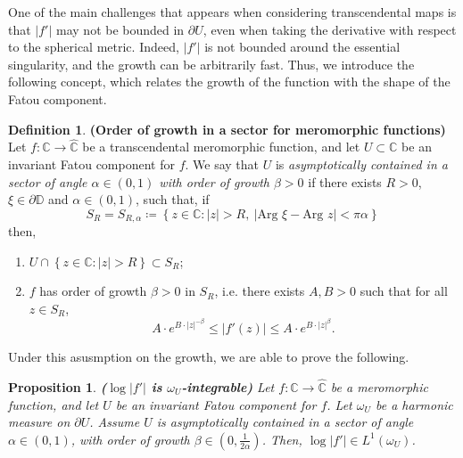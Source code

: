 \documentclass[11pt]{article}
\theoremstyle{definition}
\newtheorem*{defi*}{Definition}
\theoremstyle{remark}
\newcounter{main}
\theoremstyle{plain}
\newtheorem{mainprop}[main]{Proposition}
\begin{document}
One of the main challenges that appears when considering transcendental maps is that $ \left| f'\right|  $ may not be bounded in $ \partial U $, even when taking the derivative with respect to the spherical metric. Indeed, $ \left| f'\right|  $ is not bounded around the essential singularity, and the growth can be arbitrarily fast. Thus, we introduce the following concept, which relates the growth of the function with the shape of the Fatou component.
\begin{defi*}{\bf (Order of growth in a sector for meromorphic functions)}
	Let $ f\colon\mathbb{C}\to\widehat{\mathbb{C}}$ be a transcendental meromorphic function, and let $ U\subset \mathbb{C} $ be an invariant Fatou component for $ f $. We say that $ U $ is {\em asymptotically contained in a sector of angle $ \alpha\in   \left( 0, 1\right) $ with order of growth $ \beta >0 $} if there exists $ R>0 $, $ \xi\in \partial\mathbb{D}$ and $ \alpha \in (0,1) $, such that, if
	\[ S_R=S_{R, \alpha}\coloneqq \left\lbrace z\in\mathbb{C}\colon \left| z\right| >R , \ \left|\textrm{Arg }\xi-\textrm{Arg }z\right| <\pi \alpha\right\rbrace \]
	then, 
	\begin{enumerate}[label={(\alph*)}]
		\item  $U\cap \left\lbrace z\in\mathbb{C}\colon \left| z\right| >R\right\rbrace \subset S_{R}$;
		\item $ f $ has order of growth $ \beta>0 $ in $  S_{R} $, i.e. there exists $ A,B>0 $ such that for all $ z\in S_{R}$,  \[A \cdot e^{B\cdot \left| z\right| ^{-\beta}}\leq \left| f'(z)\right| \leq A \cdot e^{B\cdot \left| z\right| ^{\beta}}.\]
	\end{enumerate}
\end{defi*}

Under this asusmption on the growth, we are able to prove the following.

\begin{mainprop}\label{prop:D}{\bf ($ \log \left| f'\right|  $ is $ \omega_U $-integrable)}\label{prop-lyapunov-exponents well-defined}
	Let $ f\colon\mathbb{C}\to\widehat{\mathbb{C}}$ be a meromorphic function, and let $ U $ be an invariant Fatou component for $ f $. Let $ \omega_U $ be a harmonic measure on $ \partial U $. Assume $ U $ is asymptotically contained in a sector of angle $ \alpha\in \left( 0, 1\right)  $, with order of growth $ \beta\in(0, \frac1{2\alpha}) $. Then, $ \log \left| f'\right| \in L^1(\omega_U) $. 
\end{mainprop}
\end{document}
